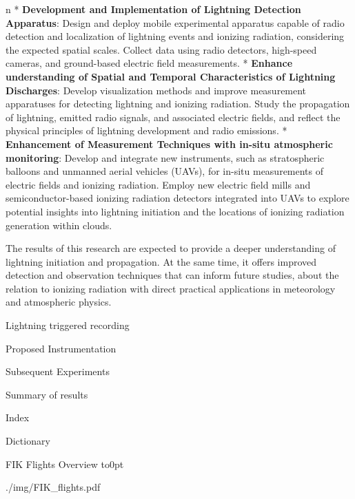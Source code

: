 \begitems \style n
* {\bf Development and Implementation of Lightning Detection Apparatus}: Design and deploy mobile experimental apparatus capable of radio detection and localization of lightning events and ionizing radiation, considering the expected spatial scales. Collect data using radio detectors, high-speed cameras, and ground-based electric field measurements.
* {\bf Enhance understanding of Spatial and Temporal Characteristics of Lightning Discharges}: Develop visualization methods and improve measurement apparatuses for detecting lightning and ionizing radiation. Study the propagation of lightning, emitted radio signals, and associated electric fields, and reflect the physical principles of lightning development and radio emissions.
* {\bf Enhancement of Measurement Techniques with in-situ atmospheric monitoring}: Develop and integrate new instruments, such as stratospheric balloons and unmanned aerial vehicles (UAVs), for in-situ measurements of electric fields and ionizing radiation. Employ new electric field mills and semiconductor-based ionizing radiation detectors integrated into UAVs to explore potential insights into lightning initiation and the locations of ionizing radiation generation within clouds.
\enditems

The results of this research are expected to provide a deeper understanding of lightning initiation and propagation. At the same time, it offers improved detection and observation techniques that can inform future studies, about the relation to ionizing radiation with direct practical applications in meteorology and atmospheric physics.

 

 Lightning triggered recording 

 

\chap[instrumentation] Proposed Instrumentation

 

\chap[experiments] Subsequent Experiments

 

\chap[results] Summary of results

 

\app Index
\makeindex

\app Dictionary
\makeglos

 FIK Flights Overview
\vbox to0pt{\vskip-25mm\centerline{\inspic ./img/FIK_flights.pdf }\vss}
\nextoddpage

